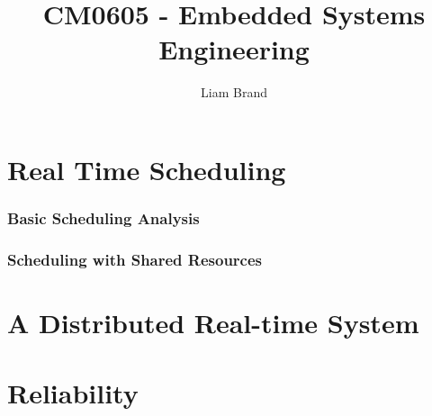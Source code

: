 \documentclass[]{report}
\title{CM0605 - Embedded Systems Engineering}
\author{Liam Brand}
\date{}
\begin{document}
\maketitle

	\chapter{Real Time Scheduling}
		\subsection{Basic Scheduling Analysis}
		
		\subsection{Scheduling with Shared Resources}
	
	
	\chapter{A Distributed Real-time System}
	
	
	
	\chapter{Reliability}
\end{document}
